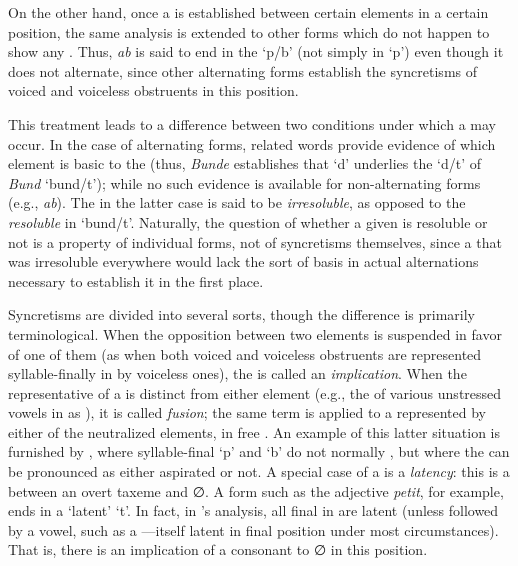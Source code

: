 On the other hand, once a  is established between certain
elements in a certain position, the same analysis is extended to other
forms which do not happen to show any . Thus, 
\emph{ab} is said to end in the  `p/b' (not simply in `p')
even though it does not alternate, since other alternating forms
establish the syncretisms of voiced and voiceless obstruents in this
position.

This treatment leads to a difference between two conditions under
which a  may occur. In the case of alternating forms,
related words provide evidence of which element is basic to the
 (thus, \emph{Bunde} establishes that `d' underlies the
 `d/t' of \emph{Bund} `bund/t'); while no such evidence is
available for non-alternating forms (e.g., \emph{ab}). The 
in the latter case is said to be \emph{irresoluble}, as opposed to the
\emph{resoluble}  in `bund/t'. Naturally, the question of
whether a given  is resoluble or not is a property of
individual forms, not of syncretisms themselves, since a 
that was irresoluble everywhere would lack the sort of basis in actual
alternations necessary to establish it in the first place.

Syncretisms are divided into several sorts, though the difference is
primarily terminological. When the opposition between two elements is
suspended in favor of one of them (as when both voiced and voiceless
obstruents are represented syllable-finally in  by voiceless
ones), the  is called an \emph{implication}. When the
representative of a  is distinct from either element (e.g.,
the  of various unstressed vowels in  as ),
it is called \emph{fusion}; the same term is applied to a 
represented by either of the neutralized elements, in free
. An example of this latter situation is furnished by ,
where syllable-final `p' and `b' do not normally , but where
the  can be pronounced as either aspirated or not. A
special case of a  is a \emph{latency}: this is a 
between an overt taxeme and ∅. A  form such as the adjective
\emph{petit}, for example, ends in a `latent' `t'. In fact, in
{\Hjelmslev}'s analysis, all final  in  are latent
(unless followed by a vowel, such as a —itself latent in final
position under most circumstances). That is, there is an implication
of a consonant to ∅ in this position.

